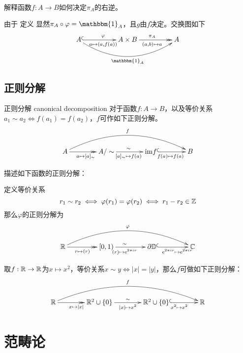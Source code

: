 \begin{problem}
	解释函数$f:A\to B$如何决定$\pi_A$的右逆。
\end{problem}

\begin{solution}
	由于
	定义
	显然$\pi_A\circ \varphi=\mathbbm{1}_A$，且$g$由$f$决定。交换图如下
	$$
	\xymatrix@=11ex{
		A \ar@/_2pc/[rr]_{\mathbbm{1}_A} \ar@{^{(}->}[r]^{\varphi}_{a\mapsto (a,f(a))} & A\times B \ar@{->>}[r]^{\pi_A}_{(a,b)\mapsto a} & A
	}
	$$
\end{solution}

\subsection{正则分解}

\begin{definition}{正则分解 canonical decomposition}
	对于函数$f:A\to B$，以及等价关系$a_1\sim a_2\iff f(a_1)=f(a_2)$，$f$可作如下正则分解。
	$$
	\xymatrix@=9ex{
		A \ar@/^2pc/[rrr]^{f} \ar@{->>}[r]_{a\mapsto[a]_{\sim}} & A/\sim \ar@{->}[r]_{[a]_\sim\mapsto f(a)}^{\sim} & \mathrm{im}f \ar@{^{(}->}[r]_{f(a)\mapsto f(a)} & B
	}
	$$
\end{definition}

\begin{problem}
	描述如下函数的正则分解：
\end{problem}

\begin{solution}
	定义等价关系
	$$
	r_1\sim r_2 \iff \varphi(r_1)=\varphi(r_2) \iff r_1-r_2\in\mathbb{Z}
	$$
	那么$\varphi$的正则分解为
	$$
	\xymatrix@=10ex{
		\R \ar@/^2pc/[rrr]^{\varphi} \ar@{->>}[r]_(0.45){r\mapsto(r)} & [0,1) \ar@{->}[r]_(0.4){(r)\mapsto \mathrm{e}^{2\pi i r}}^(0.4){\sim} & \partial\mathbb{D} \ar@{^{(}->}[r]_(0.625){\mathrm{e}^{2\pi i r}\mapsto \mathrm{e}^{2\pi i r}} & \C
	}
	$$
\end{solution}

\begin{problem}
	取$f:\mathbb{R}\to\mathbb{R}$为$x\mapsto x^2$，等价关系$x\sim y\iff |x|=|y|$，那么$f$​可做如下正则分解：
	$$
	\xymatrix@=9ex{
		\R \ar@/^2pc/[rrr]^{f} \ar@{->>}[r]_{x\mapsto|x|} & \R^2\cup\{0\} \ar@{->}[r]_{|x|\mapsto x^2}^{\sim} & \R^2\cup\{0\} \ar@{^{(}->}[r]_{x^2\mapsto x^2} & \R
	}
	$$
\end{problem}

\section{范畴论}

